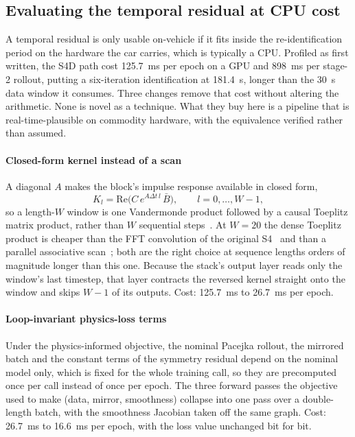 \subsection{Evaluating the temporal residual at CPU cost}
\label{sup:s4cost}
A temporal residual is only usable on-vehicle if it fits inside the
re-identification period on the hardware the car carries, which is typically a
CPU. Profiled as first written, the S4D path cost \SI{125.7}{\milli\second} per
epoch on a GPU and \SI{898}{\milli\second} per stage-2 rollout, putting a
six-iteration identification at \SI{181.4}{\second}, longer than the
\SI{30}{\second} data window it consumes. Three changes remove that cost
without altering the arithmetic. None is novel as a technique. What they buy
here is a pipeline that is real-time-plausible on commodity hardware, with the
equivalence verified rather than assumed.

\paragraph{Closed-form kernel instead of a scan}
A diagonal $A$ makes the block's impulse response available in closed form,
\begin{equation}
K_{l}=\mathrm{Re}\big(C\,e^{A\Delta t\,l}\,\bar B\big),\qquad l=0,\dots,W-1,
\label{eq:s4kernel}
\end{equation}
so a length-$W$ window is one Vandermonde product followed by a causal Toeplitz
matrix product, rather than $W$ sequential steps~\cite{gu2022s4d}. At $W=20$
the dense Toeplitz product is cheaper than the FFT convolution of the original
S4~\cite{gu2022s4} and than a parallel associative scan~\cite{smith2023s5};
both are the right choice at sequence lengths orders of magnitude longer than
this one. Because the stack's output layer reads only the window's last
timestep, that layer contracts the reversed kernel straight onto the window and
skips $W-1$ of its outputs. Cost: \SI{125.7}{\milli\second} to
\SI{26.7}{\milli\second} per epoch.

\paragraph{Loop-invariant physics-loss terms}
Under the physics-informed objective, the nominal Pacejka rollout, the mirrored
batch and the constant terms of the symmetry residual depend on the nominal
model only, which is fixed for the whole training call, so they are precomputed
once per call instead of once per epoch. The three forward passes the objective
used to make (data, mirror, smoothness) collapse into one pass over a
double-length batch, with the smoothness Jacobian taken off the same graph.
Cost: \SI{26.7}{\milli\second} to \SI{16.6}{\milli\second} per epoch, with the
loss value unchanged bit for bit.

